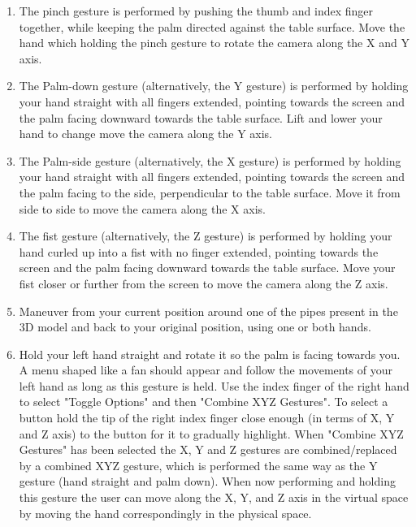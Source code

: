 \begin{enumerate}
    \item The pinch gesture is performed by pushing the thumb and index finger together, while keeping the palm directed against the table surface. 
          Move the hand which holding the pinch gesture to rotate the camera along the X and Y axis.
    
    \item The Palm-down gesture (alternatively, the Y gesture) is performed by holding your hand straight with all fingers extended, pointing towards the screen and the palm facing downward towards the table surface. 
          Lift and lower your hand to change move the camera along the Y axis. 
    
    \item The Palm-side gesture (alternatively, the X gesture) is performed by holding your hand straight with all fingers extended, pointing towards the screen and the palm facing to the side, 
          perpendicular to the table surface. 
          Move it from side to side to move the camera along the X axis.
    
    \item The fist gesture (alternatively, the Z gesture) is performed by holding your hand curled up into a fist with no finger extended, pointing towards the screen and the palm facing downward towards the table surface. 
          Move your fist closer or further from the screen to move the camera along the Z axis. 
    
    \item Maneuver from your current position around one of the pipes present in the 3D model and back to your original position, using one or both hands. 
    
    \item Hold your left hand straight and rotate it so the palm is facing towards you. A menu shaped like a fan should appear and follow the movements of your left hand as long as
          this gesture is held. Use the index finger of the right hand to select "Toggle Options" and then "Combine XYZ Gestures". 
          To select a button hold the tip of the right index finger close enough (in terms of X, Y and Z axis) to the button for it to gradually highlight. 
          When "Combine XYZ Gestures" has been selected the X, Y and Z gestures are combined/replaced by a combined XYZ gesture, which is performed the same way as the Y gesture
          (hand straight and palm down). When now performing and holding this gesture the user can move along the X, Y, and Z axis in the virtual space by moving the hand 
          correspondingly in the physical space.


\end{enumerate}
